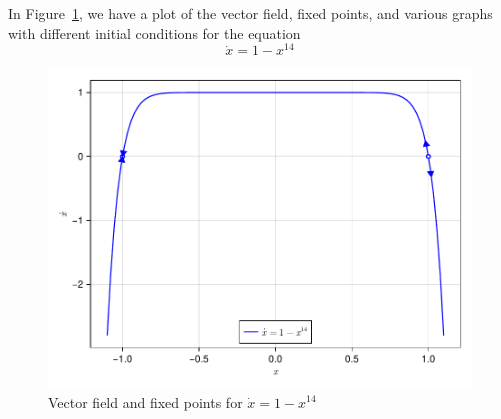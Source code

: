 
In Figure~\ref{fig2_2_2vecfield}, we have a plot of the vector field, fixed points,
and various graphs with different initial conditions for the equation 
\[
    \dot{x} = 1 - x^{14}
\]
\begin{figure}[!ht]
    \includegraphics[scale=0.6, center]{../plots/ch02/ex2_2_2.pdf}
    \caption{Vector field and fixed points for $\dot{x} = 1 - x^{14}$\label{fig2_2_2vecfield}}
\end{figure}

